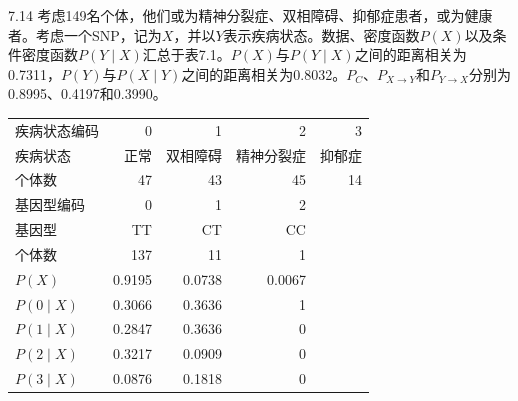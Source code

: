 \begin{bookexample}{7.14}
考虑149名个体，他们或为精神分裂症、双相障碍、抑郁症患者，或为健康者。考虑一个SNP，记为$X$，并以$Y$表示疾病状态。数据、密度函数$P(X)$以及条件密度函数$P(Y\mid X)$汇总于表7.1。$P(X)$与$P(Y\mid X)$之间的距离相关为0.7311，$P(Y)$与$P(X\mid Y)$之间的距离相关为0.8032。$P_C$、$P_{X\to Y}$和$P_{Y\to X}$分别为0.8995、0.4197和0.3990。
\end{bookexample}
\begin{table}[htbp]
\centering\small
{}
\begin{tabular}{lrrrr}
\toprule
疾病状态编码&0&1&2&3\\
疾病状态&正常&双相障碍&精神分裂症&抑郁症\\
个体数&47&43&45&14\\
基因型编码&0&1&2&\\
基因型&TT&CT&CC&\\
个体数&137&11&1&\\
$P(X)$&0.9195&0.0738&0.0067&\\
$P(0\mid X)$&0.3066&0.3636&1&\\
$P(1\mid X)$&0.2847&0.3636&0&\\
$P(2\mid X)$&0.3217&0.0909&0&\\
$P(3\mid X)$&0.0876&0.1818&0&\\
\bottomrule
\end{tabular}
\end{table}
